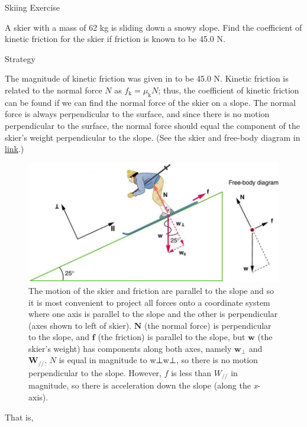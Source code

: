 \documentclass[
]{book}
\begin{document}
\hypertarget{fs-id1704828}{}
Skiing Exercise

A skier with a mass of 62 kg is sliding down a snowy slope. Find the
coefficient of kinetic friction for the skier if friction is known to be
45.0 N.

{Strategy}

The magnitude of kinetic friction was given in to be 45.0 N. Kinetic
friction is related to the normal force \(N{}\) as
\({{f_{\text{k}} = \mu_{\text{k}}}N}{}\); thus, the coefficient of kinetic
friction can be found if we can find the normal force of the skier on a
slope. The normal force is always perpendicular to the surface, and
since there is no motion perpendicular to the surface, the normal force
should equal the component of the skier's weight perpendicular to the
slope. (See the skier and free-body diagram in
\protect\hyperlink{import-auto-id1165296217411}{link}.)

\begin{figure}
\hypertarget{import-auto-id1165296217411}{%
\centering
\includegraphics{images/Figure_06_01_03a.jpg}
\caption{The motion of the skier and friction are parallel to the slope and so
it is most convenient to project all forces onto a coordinate system
where one axis is parallel to the slope and the other is perpendicular
(axes shown to left of skier). \(\textbf{N}\) (the normal force) is
perpendicular to the slope, and \(\textbf{f}\) (the friction) is parallel
to the slope, but \(\textbf{w}\) (the skier's weight) has components
along both axes, namely \(\textbf{w}_{\text{⊥}}{}\) and
\(\textbf{W}_{//}{}\). \(N{}\) is equal in magnitude to {w⊥w⊥}, so there
is no motion perpendicular to the slope. However, \(f{}\) is less than
\(W_{\text{//}}{}\) in magnitude, so there is acceleration down the slope
(along the
\emph{x}-axis).}\label{import-auto-id1165296217411}
}
\end{figure}

That is,
\end{document}
